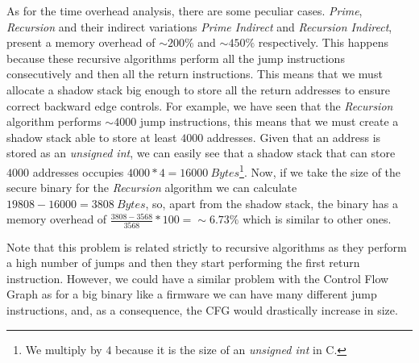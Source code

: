 As for the time overhead analysis, there are some peculiar cases. \textit{Prime},
\textit{Recursion} and their indirect variations \textit{Prime Indirect} and
\textit{Recursion Indirect}, present a memory overhead of $\sim 200\%$ and
$\sim 450\%$ respectively. This happens because these recursive algorithms perform
all the jump instructions consecutively and then all the return instructions.
This means that we must allocate a shadow stack big enough to store all the
return addresses to ensure correct backward edge controls. For example, we have
seen that the \textit{Recursion} algorithm performs $\sim 4000$ jump instructions,
this means that we must create a shadow stack able to store at least $4000$
addresses. Given that an address is stored as an \textit{unsigned int}, we can easily
see that a shadow stack that can store $4000$ addresses occupies $4000*4 = 16000
\ \textit{Bytes}$\footnote{We multiply by $4$ because it is the size of an
\textit{unsigned int} in C.}. Now, if we take the size of the secure binary for
the \textit{Recursion} algorithm we can calculate $19808 - 16000 = 3808 \ \textit
{Bytes}$, so, apart from the shadow stack, the binary has a memory overhead of
$\frac{3808-3568}{3568}*100 = \sim 6. 73\%$ which is similar to other ones.

Note that this problem is related strictly to recursive algorithms as they
perform a high number of jumps and then they start performing the first return
instruction. However, we could have a similar problem with the Control Flow
Graph as for a big binary like a firmware we can have many different jump
instructions, and, as a consequence, the CFG would drastically increase in size.

